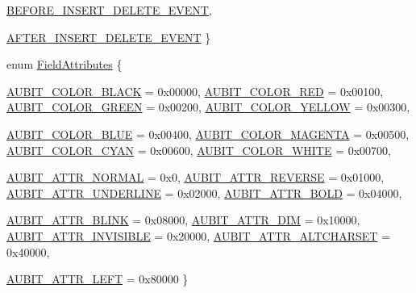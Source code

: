 \begin{DoxyCompactItemize}
\hyperlink{namespaceFgl_a7bbae69263a5d0012370d5cbb859c6a8a6407f2770e2022a7c3f6245a05ece9b9}{BEFORE\_\-INSERT\_\-DELETE\_\-EVENT}, 
\par
\hyperlink{namespaceFgl_a7bbae69263a5d0012370d5cbb859c6a8a49151d7b6ee9ad9bc86c2caddfb398d0}{AFTER\_\-INSERT\_\-DELETE\_\-EVENT}
 \}
\item 
enum \hyperlink{namespaceFgl_a84fecc3553ced7408465762be30c82fb}{FieldAttributes} \{ \par
\hyperlink{namespaceFgl_a84fecc3553ced7408465762be30c82fbacfbcf23c543050264e8b0760c17dd5e9}{AUBIT\_\-COLOR\_\-BLACK} =  0x00000, 
\hyperlink{namespaceFgl_a84fecc3553ced7408465762be30c82fba09168ef8df113d902dea228001ea27dd}{AUBIT\_\-COLOR\_\-RED} =  0x00100, 
\hyperlink{namespaceFgl_a84fecc3553ced7408465762be30c82fbaee0e8be59c72b091afc98f7284fdee71}{AUBIT\_\-COLOR\_\-GREEN} =  0x00200, 
\hyperlink{namespaceFgl_a84fecc3553ced7408465762be30c82fba878fa2e855e7bdc2afae0722530b1be0}{AUBIT\_\-COLOR\_\-YELLOW} =  0x00300, 
\par
\hyperlink{namespaceFgl_a84fecc3553ced7408465762be30c82fba92835f358c3709a81aa16d40757a157d}{AUBIT\_\-COLOR\_\-BLUE} =  0x00400, 
\hyperlink{namespaceFgl_a84fecc3553ced7408465762be30c82fba79fef77789aecd8701b3c81f7ce8f929}{AUBIT\_\-COLOR\_\-MAGENTA} =  0x00500, 
\hyperlink{namespaceFgl_a84fecc3553ced7408465762be30c82fba6220aabb66f9b00e3dfec17986bb401b}{AUBIT\_\-COLOR\_\-CYAN} =  0x00600, 
\hyperlink{namespaceFgl_a84fecc3553ced7408465762be30c82fba3fcd51188bbb620691dbbe5678f1e4d4}{AUBIT\_\-COLOR\_\-WHITE} =  0x00700, 
\par
\hyperlink{namespaceFgl_a84fecc3553ced7408465762be30c82fba04c7fe736f33af94e76b3aad1614baaa}{AUBIT\_\-ATTR\_\-NORMAL} =  0x0, 
\hyperlink{namespaceFgl_a84fecc3553ced7408465762be30c82fbac28aa3d9263ae597c461f55417935daf}{AUBIT\_\-ATTR\_\-REVERSE} =  0x01000, 
\hyperlink{namespaceFgl_a84fecc3553ced7408465762be30c82fbadce2649f08f8c7e01012cd1feab0fcbe}{AUBIT\_\-ATTR\_\-UNDERLINE} =  0x02000, 
\hyperlink{namespaceFgl_a84fecc3553ced7408465762be30c82fbae0684cc037518f62d980ca40ea7bcd03}{AUBIT\_\-ATTR\_\-BOLD} =  0x04000, 
\par
\hyperlink{namespaceFgl_a84fecc3553ced7408465762be30c82fba9af5eb28087d2de8337b247b2c630dd6}{AUBIT\_\-ATTR\_\-BLINK} =  0x08000, 
\hyperlink{namespaceFgl_a84fecc3553ced7408465762be30c82fba076fe163a0e45025344e5fe7259b71b3}{AUBIT\_\-ATTR\_\-DIM} =  0x10000, 
\hyperlink{namespaceFgl_a84fecc3553ced7408465762be30c82fba717d2efa26078d014e14123bec249c6b}{AUBIT\_\-ATTR\_\-INVISIBLE} =  0x20000, 
\hyperlink{namespaceFgl_a84fecc3553ced7408465762be30c82fbaaaa9c0f3337d29af9e35ad5037bd2f08}{AUBIT\_\-ATTR\_\-ALTCHARSET} =  0x40000, 
\par
\hyperlink{namespaceFgl_a84fecc3553ced7408465762be30c82fbaa65394cd0a8d74265414e97f890ffd86}{AUBIT\_\-ATTR\_\-LEFT} =  0x80000
 \}
\end{DoxyCompactItemize}
